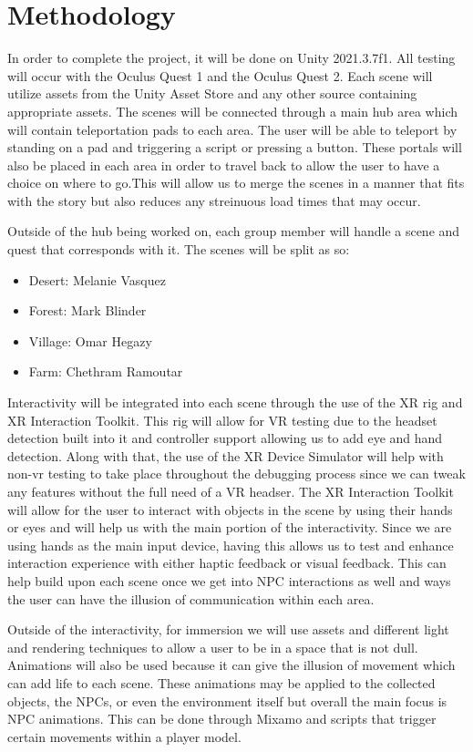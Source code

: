 \documentclass{vgtc}                          %
\begin{document}
\section{Methodology}
In order to complete the project, it will be done on Unity 2021.3.7f1. All testing will occur with the Oculus Quest 1 and the Oculus Quest 2. Each scene will utilize assets from the Unity Asset Store and any other
source containing appropriate assets. The scenes will be connected through a main hub area which will contain teleportation pads to each area. The user will be able to teleport by standing on a pad and triggering
a script or pressing a button. These portals will also be placed in each area
in order to travel back to allow the user to have a choice on where to go.This will allow us to merge the scenes in a manner that fits with the story but also reduces any streinuous load times that may
occur.

Outside of the hub being worked on, each group member will handle a scene and quest that corresponds with it. The scenes will be split as so:
\begin{itemize}
  \item Desert: Melanie Vasquez
  \item Forest: Mark Blinder
  \item Village: Omar Hegazy
  \item Farm: Chethram Ramoutar
\end{itemize}

Interactivity will be integrated into each scene through the use of the XR rig and XR Interaction Toolkit. This rig will allow for VR testing due to the headset detection built into it and controller support allowing us to add eye and hand detection.
Along with that, the use of the XR Device Simulator will help with non-vr testing to take place throughout the debugging process since we can tweak any features without the full need of a VR headser. The XR Interaction Toolkit will allow for the user to
interact with objects in the scene by using their hands or eyes and will help us with the main portion of the interactivity. Since we are using hands as the main input device, having this allows us to test and enhance interaction experience with either haptic feedback
or visual feedback. This can help build upon each scene once we get into NPC interactions as well and ways the user can have the illusion of communication within each area.

Outside of the interactivity, for immersion we will use assets and different light and rendering techniques to allow a user to be in a space that is not dull. Animations will also be used because it can give the illusion of movement which can add life to each scene.
These animations may be applied to the collected objects, the NPCs, or even the environment itself but overall the main focus is NPC animations. This can be done through Mixamo and scripts that trigger certain movements within a player model.
\end{document}
